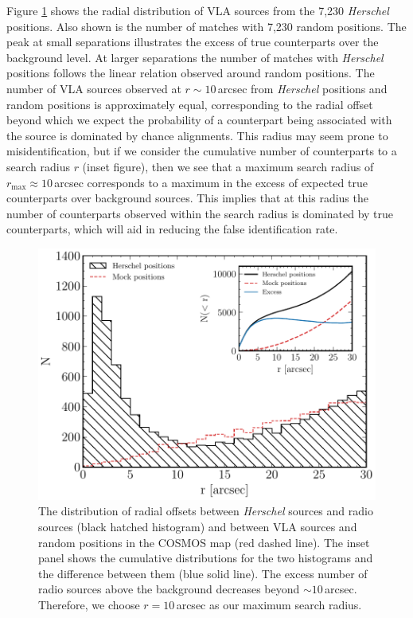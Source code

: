 Figure \ref{fig:optimal_radius} shows the radial distribution of VLA sources from the 7,230 \textit{Herschel} positions. Also shown is the number of matches with 7,230 random positions. The peak at small separations illustrates the excess of true counterparts over the background level. At larger separations the number of matches with \textit{Herschel} positions follows the linear relation observed around random positions. The number of VLA sources observed at $r \sim 10$\,arcsec from \textit{Herschel} positions and random positions is approximately equal, corresponding to the radial offset beyond which we expect the probability of a counterpart being associated with the source is dominated by chance alignments. This radius may seem prone to misidentification, but if we consider the cumulative number of counterparts to a search radius $r$ (inset figure), then we see that a maximum search radius of $r_{\textrm{max}} \approx 10$\,arcsec corresponds to a maximum in the excess of expected true counterparts over background sources. This implies that at this radius the number of counterparts observed within the search radius is dominated by true counterparts, which will aid in reducing the false identification rate.

\begin{figure}
	\centering
	\includegraphics[width=0.75\columnwidth]{Figures/optimal_radius.pdf}
	\caption{The distribution of radial offsets between \textit{Herschel} sources and radio sources (black hatched histogram) and between VLA sources and random positions in the COSMOS map (red dashed line). The inset panel shows the cumulative distributions for the two histograms and the difference between them (blue solid line). The excess number of radio sources above the background decreases beyond $\sim10\,$arcsec. Therefore, we choose $r = 10\,$arcsec as our maximum search radius.}
	\label{fig:optimal_radius}
\end{figure}

